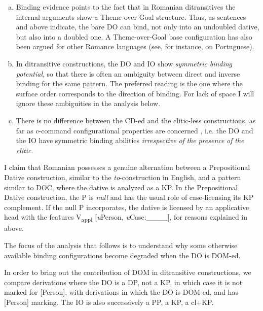\documentclass[output=paper,colorlinks,citecolor=brown,nonflat]{./langscibook}
\begin{document}
\begin{enumerate}[a.]
	\item Binding evidence points to the fact that in Romanian ditransitives the internal arguments show a Theme-over-Goal structure. Thus, as sentences  and  above indicate, the bare DO can bind, not only into an undoubled dative, but also into a doubled one. A Theme-over-Goal base configuration has also been argued for other Romance languages (see, for instance,  on Portuguese).
	
	\item In ditransitive constructions, the DO and IO show \textit{symmetric} \textit{binding} \textit{potential}, so that there is often an ambiguity between direct and inverse binding for the same pattern. The preferred reading is the one where the surface order corresponds to the direction of binding. For lack of space I will ignore these ambiguities in the analysis below.
	
	\item There is no difference between the CD-ed and the clitic-less constructions, as far as c-command configurational properties are concerned \citep{CornilescuDinuTigău2017DOC}, i.e. the DO and the IO have symmetric binding abilities \textit{irrespective} \textit{of} \textit{the} \textit{presence} \textit{of} \textit{the} \textit{clitic}.
\end{enumerate}


I claim that Romanian possesses a genuine alternation between a Prepositional Dative construction, similar to the \textit{to}{}-construction in English, and a pattern similar to DOC, where the dative is analyzed as a KP. In the Prepositional Dative construction, the P is \textit{null} and has the usual role of case-licensing its KP complement. If the null P incorporates, the dative is licensed by an applicative head with the features V\textsubscript{appl} [\textit{u}Person, \textit{u}Case:\_\_\_\_], for reasons explained in  above.

The focus of the analysis that follows is to understand why some otherwise available binding configurations become degraded when the DO is DOM-ed.

In order to bring out the contribution of DOM in ditransitive constructions, we compare derivations where the DO is a DP, not a KP, in which case it is not marked for [Person], with derivations in which the DO is DOM-ed, and has [Person] marking. The IO is also successively a PP, a KP, a cl+KP.
\end{document}

